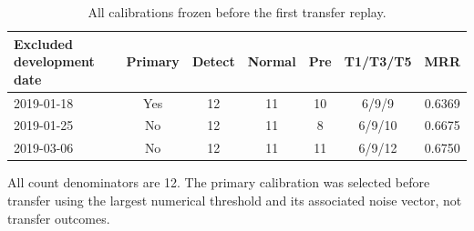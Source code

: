 \begin{table}[htbp]
\centering\footnotesize
\caption{All calibrations frozen before the first transfer replay.}
\label{tab:s_folds}
\renewcommand{\arraystretch}{1.15}
\setlength{\tabcolsep}{4pt}
\begin{tabular}{lcccccc}
\toprule
Excluded development date & Primary & Detect & Normal & Pre & T1/T3/T5 & MRR\\
\midrule
2019-01-18 & Yes & 12 & 11 & 10 & 6/9/9 & 0.6369\\
2019-01-25 & No & 12 & 11 & 8 & 6/9/10 & 0.6675\\
2019-03-06 & No & 12 & 11 & 11 & 6/9/12 & 0.6750\\
\bottomrule
\end{tabular}
\par\smallskip\parbox{0.98\linewidth}{\scriptsize All count denominators are 12. The primary calibration was selected before transfer using the largest numerical threshold and its associated noise vector, not transfer outcomes.}
\end{table}
